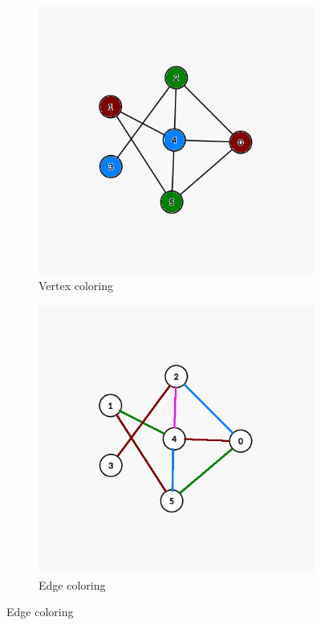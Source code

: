 \begin{figure}
  \centering
  \begin{subfigure}[b]{0.49\textwidth}
      \centering
      \includegraphics[width=\textwidth]{images/vertex-coloring.png}
      \caption{Vertex coloring}
      \label{fig:vertex-coloring}
  \end{subfigure}
  \hfill
  \begin{subfigure}[b]{0.49\textwidth}
      \centering
      \includegraphics[width=\textwidth]{images/edge-coloring.png}
      \caption{Edge coloring}
      \label{fig:edge-coloring}
  \end{subfigure}


\end{figure}
